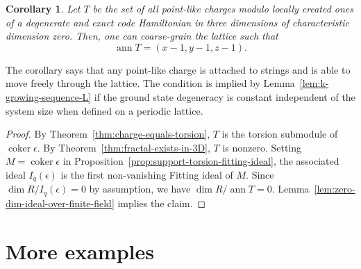 \documentclass[letterpaper,12pt]{amsart}
\newtheorem{cor}[lem]{Corollary}
\theoremstyle{definition} \newtheorem{defn}{Definition}
\theoremstyle{definition} \newtheorem{rem}{Remark}
\theoremstyle{definition} \newtheorem{example}{Example}
\newcommand{\coker}{\mathop{\mathrm{coker}}}
\newcommand{\ann}{\mathop{\mathrm{ann}}}
\begin{document}
\begin{cor}
Let $T$ be the set of all point-like charges modulo locally created ones
of a degenerate and exact code Hamiltonian in three dimensions
of characteristic dimension zero.
Then, one can coarse-grain the lattice such that
\[
 \ann T = (x-1,y-1,z-1) .
\]
\label{cor:annT-3d-characteristic-dimension-0}
\end{cor}
\noindent
The corollary says that any point-like charge is attached to strings and is able to move freely through the lattice.
The condition is implied by Lemma~\ref{lem:k-growing-sequence-L} 
if the ground state degeneracy is constant independent of the system size
when defined on a periodic lattice.
\begin{proof}
By Theorem~\ref{thm:charge-equals-torsion}, $T$ is the torsion submodule of $\coker \epsilon$.
By Theorem~\ref{thm:fractal-exists-in-3D}, $T$ is nonzero.
Setting $M = \coker \epsilon$ in Proposition~\ref{prop:support-torsion-fitting-ideal},
the associated ideal $I_q(\epsilon)$ is the first non-vanishing Fitting ideal of $M$.
Since $\dim R / I_q(\epsilon) = 0$ by assumption, we have $\dim R / \ann T = 0$.
Lemma~\ref{lem:zero-dim-ideal-over-finite-field} implies the claim.
\end{proof}


\section{More examples}
\label{sec:eg}
\end{document}
